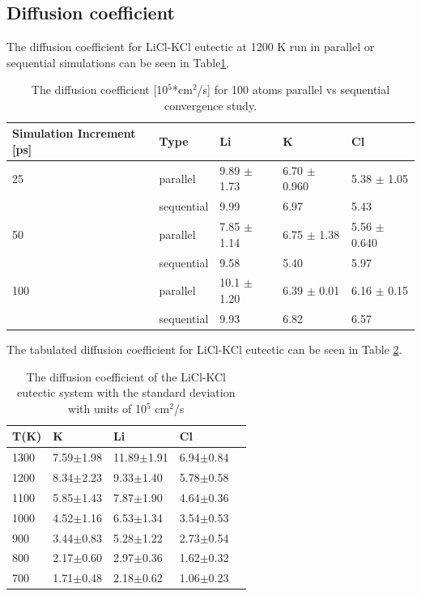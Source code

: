 \documentclass[review]{elsarticle}
\begin{document}
\appendix

\section{}
\subsection{Diffusion coefficient}
The diffusion coefficient for LiCl-KCl eutectic at 1200 K run in parallel or sequential simulations can be seen in Table\ref{Table:parVSseq}.

\begin{table}[h]
\centering
\caption{The diffusion coefficient [10$^5$*cm$^2$/s] for 100 atoms parallel vs sequential convergence study. }
\begin{tabular}{lllll}
\hline
Simulation Increment   {[}ps{]} & Type       & Li       & K        & Cl       \\
\hline
25                              & parallel   & 9.89 $\pm$ 1.73& 6.70 $\pm$ 0.960& 5.38 $\pm$ 1.05\\
& sequential & 9.99 & 6.97 & 5.43 \\
50 & parallel   & 7.85  $\pm$ 1.14& 6.75 $\pm$ 1.38& 5.56 $\pm$  0.640\\
 & sequential & 9.58 & 5.40 & 5.97 \\
100 & parallel   & 10.1  $\pm$ 1.20& 6.39 $\pm$  0.01 & 6.16 $\pm$  0.15\\
& sequential & 9.93 & 6.82 & 6.57 \\
\hline
\end{tabular}
\label{Table:parVSseq}
\end{table}
\FloatBarrier

The tabulated diffusion coefficient for LiCl-KCl eutectic can be seen in Table \ref{Table: licl-kcl-eut diffusion}.

\begin{table}[h]
\centering
\caption{The diffusion coefficient of the LiCl-KCl eutectic system with the standard deviation with units of 10$^5$ cm$^2$/s }
\begin{tabular}{lllll}
\hline
T(K) & K           & Li          & Cl          &  \\
\hline
1300 & 7.59$\pm$1.98 & 11.89$\pm$1.91 & 6.94$\pm$0.84 &  \\
1200 & 8.34$\pm$2.23 & 9.33$\pm$1.40  & 5.78$\pm$0.58 &  \\
1100 & 5.85$\pm$1.43 & 7.87$\pm$1.90  & 4.64$\pm$0.36 &  \\
1000 & 4.52$\pm$1.16 & 6.53$\pm$1.34  & 3.54$\pm$0.53 &  \\
900  & 3.44$\pm$0.83 & 5.28$\pm$1.22  & 2.73$\pm$0.54 &  \\
800  & 2.17$\pm$0.60 & 2.97$\pm$0.36  & 1.62$\pm$0.32 &  \\
700  & 1.71$\pm$0.48 & 2.18$\pm$0.62  & 1.06$\pm$0.23  \\
\hline
\end{tabular}
\label{Table: licl-kcl-eut diffusion}
\end{table}
\FloatBarrier
\end{document}
